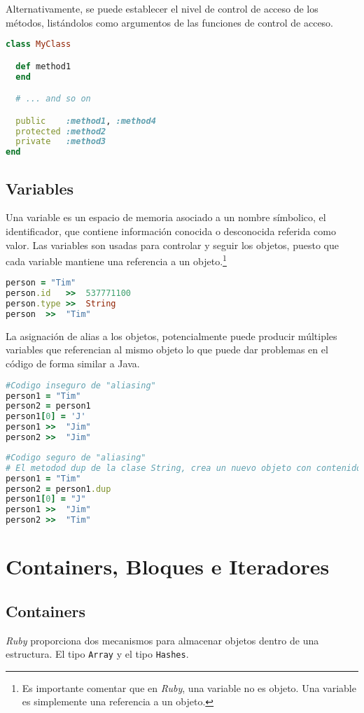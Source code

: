 Alternativamente, se puede establecer el nivel de control de acceso de los métodos, listándolos como argumentos de las funciones de control de acceso.

\begin{lstlisting}[language=Ruby]
class MyClass

  def method1
  end

  # ... and so on

  public    :method1, :method4
  protected :method2
  private   :method3
end
\end{lstlisting}

\subsection{Variables}
Una variable es un espacio de memoria asociado a un nombre símbolico, el identificador, que contiene información conocida o desconocida referida como valor. Las variables son usadas para controlar y seguir los objetos, puesto que cada variable mantiene una referencia a un objeto.\footnote{Es importante comentar que en \textit{Ruby}, una variable no es objeto. Una variable es simplemente una referencia a un objeto.}

\begin{lstlisting}[language=Ruby]
person = "Tim"
person.id	>>	537771100
person.type	>>	String
person	>>	"Tim"
\end{lstlisting}

La asignación de alias a los objetos, potencialmente puede producir múltiples variables que referencian al mismo objeto lo que puede dar problemas en el código de forma similar a Java.

\begin{lstlisting}[language=Ruby]
#Codigo inseguro de "aliasing"
person1 = "Tim"
person2 = person1
person1[0] = 'J'
person1	>>	"Jim"
person2	>>	"Jim"
\end{lstlisting}

\begin{lstlisting}[language=Ruby]
#Codigo seguro de "aliasing"
# El metodod dup de la clase String, crea un nuevo objeto con contenido similar.
person1 = "Tim"
person2 = person1.dup
person1[0] = "J"
person1	>>	"Jim"
person2	>>	"Tim"
\end{lstlisting}

\section{Containers, Bloques e Iteradores}
\subsection{Containers}
\textit{Ruby} proporciona dos mecanismos para almacenar objetos dentro de una estructura. El tipo \texttt{Array} y el tipo \texttt{Hashes}.
